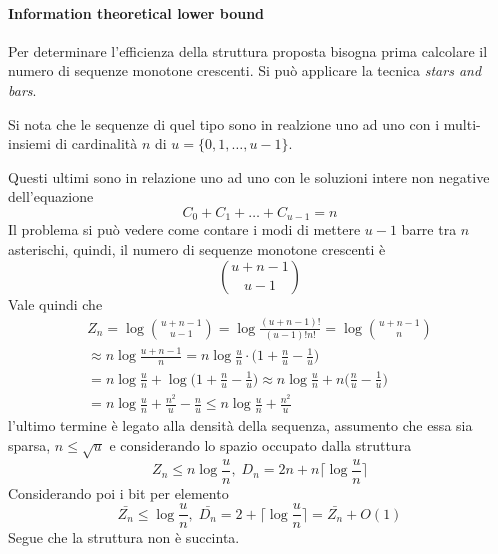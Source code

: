 \paragraph{Information theoretical lower bound}
Per determinare l'efficienza della struttura proposta bisogna prima calcolare 
il numero di sequenze monotone crescenti.
Si può applicare la tecnica \emph{stars and bars}.

Si nota che le sequenze di quel tipo sono in realzione uno ad uno 
con i multi-insiemi di cardinalità $n$ di $u = \{0,1,\dots, u-1\}$.

Questi ultimi sono in relazione uno ad uno con le soluzioni intere non negative
dell'equazione 
$$C_0 + C_1 + \dots + C_{u-1} = n$$
Il problema si può vedere come contare i modi di mettere $u-1$ barre tra $n$ asterischi, 
quindi, il numero di sequenze monotone crescenti è
$$\binom{u + n-1}{u-1}$$
Vale quindi che 
\begin{equation}
    \begin{aligned}
        Z_n = \log \binom{u + n-1}{u-1} = \log \frac{(u+n-1)!}{(u-1)! n!} = \log \binom
        {u+n-1}{n} \\
        \approx n\log\frac{u+n-1}{n} = n\log\frac{u}{n}\cdot\bigg(1 + \frac{n}{u} - \frac{1}{u}\bigg)
        \\= n\log\frac{u}{n} + \log \bigg(1 + \frac{n}{u} - \frac{1}{u}\bigg) \approx
        n\log\frac{u}{n} + n \bigg(\frac{n}{u} - \frac{1}{u}\bigg)\\
        = n \log \frac{u}{n} + \frac{n^2}{u} - \frac{n}{u} \leq n\log\frac{u}{n} + \frac{n^2}{u}
    \end{aligned}
\end{equation}
l'ultimo termine è legato alla densità della sequenza, assumento che essa sia sparsa, 
$n \leq \sqrt{u}$ e considerando lo spazio occupato dalla struttura
$$Z_n \leq n\log\frac{u}{n},\; D_n = 2n + n\bigg\lceil \log \frac{u}{n}\bigg\rceil$$
Considerando poi i bit per elemento
$$\bar{Z_n} \leq \log\frac{u}{n}, \; \bar{D_n} = 2 + \bigg\lceil \log \frac{u}{n}\bigg\rceil 
= \bar{Z_n} + O(1)$$
Segue che la struttura non è succinta.
